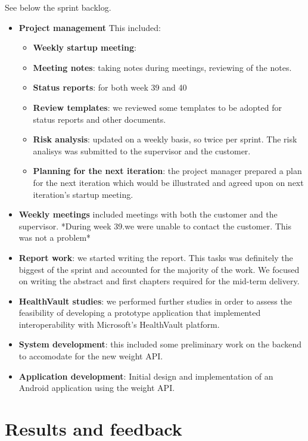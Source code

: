 See below the sprint backlog.
\begin{itemize}
	\item \textbf{Project management}\newline
	This included:
	\begin{itemize}
		\item \textbf{Weekly startup meeting}:
		\item \textbf{Meeting notes}:
			taking notes during meetings, reviewing of the notes.
		\item \textbf{Status reports}:
			for both week 39 and 40
		\item \textbf{Review templates}:
			we reviewed some templates to be adopted for status reports and other documents.
		\item \textbf{Risk analysis}:
			updated on a weekly basis, so twice per sprint.
			The risk analisys was submitted to the supervisor and the customer.
		\item \textbf{Planning for the next iteration}:
			the project manager prepared a plan for the next iteration
			which would be illustrated and agreed upon on next iteration's startup meeting.
	\end{itemize}
	\item \textbf{Weekly meetings}
		included meetings with both the customer and the supervisor.
		*During week 39.we were unable to contact the customer. This was not a problem*
	\item \textbf{Report work}:
		we started writing the report.
		This tasks was definitely the biggest of the sprint and accounted for the majority of the work.
		We focused on writing the abstract and first chapters required for the mid-term delivery.
	\item \textbf{HealthVault studies}:
		we performed further studies in order to assess the feasibility of developing a prototype
		application that implemented interoperability with Microsoft's HealthVault platform.
	\item \textbf{System development}:
		this included some preliminary work on the backend to accomodate for the new weight API.
	\item \textbf{Application development}:
		Initial design and implementation of an Android application using the weight API.

\end{itemize}


\section{Results and feedback}


